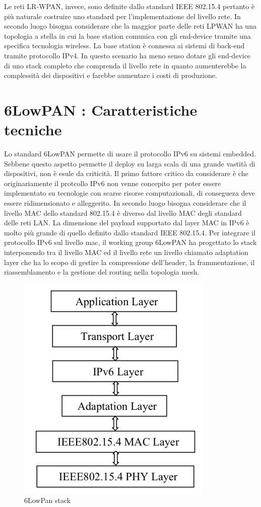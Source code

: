 \documentclass[12pt,a4paper,openright,twoside]{report}
\begin{document}
Le reti LR-WPAN, invece, sono definite dallo standard IEEE 802.15.4 pertanto \`e pi\`u naturale costruire uno standard per l'implementazione del livello rete.
In secondo luogo bisogna considerare che la maggior parte delle reti LPWAN ha una topologia a stella in cui la base station comunica con gli end-device tramite una specifica tecnologia wireless. La base station \`e connessa ai sistemi di back-end tramite protocollo IPv4. In questo scenario ha meno senso dotare gli end-device di uno stack completo che comprenda il livello rete in quanto aumenterebbe la complessit\`a dei dispositivi e farebbe aumentare i costi di produzione.   

\section{6LowPAN : Caratteristiche tecniche}
Lo standard 6LowPAN permette di usare il protocollo IPv6 su sistemi embedded.
Sebbene questo aspetto permette il deploy su larga scala di una grande vastit\`a di dispositivi, non \`e esule da criticit\`a. Il primo fattore critico da considerare \`e che originariamente il protcollo IPv6 non venne concepito per poter essere implementato su tecnologie con scarse risorse computazionali, di consegueza deve essere ridimensionato e alleggerito.
In secondo luogo bisogna considerare che il livello MAC dello standard 802.15.4 \`e diverso dal livello MAC degli standard delle reti LAN.
La dimensione del payload supportato dal layer MAC in IPv6 \`e molto pi\`u grande di quello definito dallo standard IEEE 802.15.4. 
Per integrare il protocollo IPv6 sul livello mac, il working group 6LowPAN ha progettato lo stack interponendo tra il livello MAC ed il livello rete un livello chiamato adaptation layer che ha lo scopo di gestire la compressione dell'header, la frammentazione, il riassemblamento e la gestione del routing nella topologia mesh.	
\begin{figure}[h]                      
\begin{center} 
\includegraphics[width=\textwidth,height=110mm]{6lowpan_stack.png}
\caption[6LowPan stack]{6LowPan stack}\label{fig:decima}
\end{center}
\end{figure}
\end{document}
